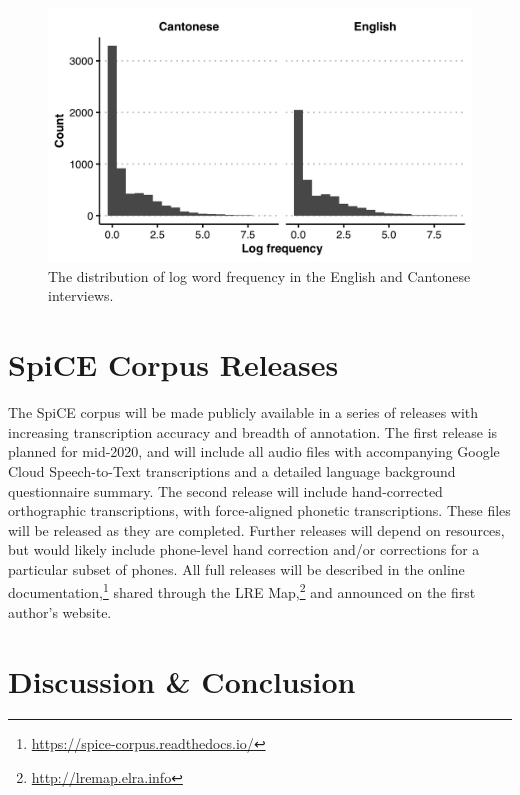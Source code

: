 \begin{figure}[!htbp]
  \begin{center}
  \includegraphics[width=5in]{figures/ch2_wordfrequency_5in.png} 
  \caption{The distribution of log word frequency in the English and Cantonese interviews.}
  \label{ch2:fig:wordfrequency}
  \end{center}
  \end{figure}

\section{SpiCE Corpus Releases}\label{ch2:sec:releases}

The SpiCE corpus will be made publicly available in a series of releases with increasing transcription accuracy and breadth of annotation. The first release is planned for mid-2020, and will include all audio files with accompanying Google Cloud Speech-to-Text transcriptions and a detailed language background questionnaire summary. The second release will include hand-corrected orthographic transcriptions, with force-aligned phonetic transcriptions. These files will be released as they are completed. Further releases will depend on resources, but would likely include phone-level hand correction and/or corrections for a particular subset of phones. All full releases will be described in the online documentation,\footnote{\url{https://spice-corpus.readthedocs.io/}} shared through the LRE Map,\footnote{\url{http://lremap.elra.info}} and announced on the first author's website.

\section{Discussion \& Conclusion}\label{ch2:subsec:discussion}


